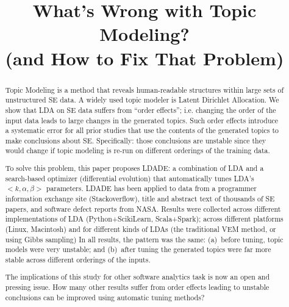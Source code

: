 \documentclass[10pt,conference]{IEEEtran}
\theoremstyle{break}
\begin{document}
\pagestyle{plain}

\title{\textbf{What's Wrong with
Topic Modeling?\\ (and How to Fix That Problem)}}


\author{
\and
{}
\and
{}
}

\maketitle


\begin{abstract}
  Topic Modeling is a method that reveals human-readable structures within large sets of unstructured SE data.
  A widely used topic modeler is Latent Dirichlet Allocation. We show that LDA on SE data suffers
  from ``order effects''; i.e. changing the order of the input data leads to
  large changes in the generated topics.
Such order effects introduce a systematic error
for all prior  studies that use the contents of the generated topics to make 
conclusions about SE. Specifically: those conclusions are unstable since they would 
change if topic modeling is re-run on different orderings
of the training data.

To solve this problem, this paper proposes LDADE: a  combination of LDA and a search-based optimizer (differential evolution)
that automatically tunes LDA's $<k,\alpha,\beta>$ parameters. LDADE has been applied
to data from a programmer information exchange site (Stackoverflow), title and abstract text of
thousands of SE papers, and software defect reports from NASA.    Results were collected across different implementations of LDA (Python+ScikiLearn, Scala+Spark); across different platforms (Linux, Macintosh) and for different kinds of LDAs (the traditional VEM method, or using  Gibbs sampling)
  In all results, the pattern was the same:  (a)~before tuning, topic models were very unstable; and (b)~after tuning
  the generated topics were far more stable across different orderings of the inputs. 
  
The implications of this study for other software analytics task is now an open and pressing issue. 
How many other results suffer from order effects leading to unstable conclusions
can be improved using  automatic tuning methods?
\end{abstract}
\end{document}

